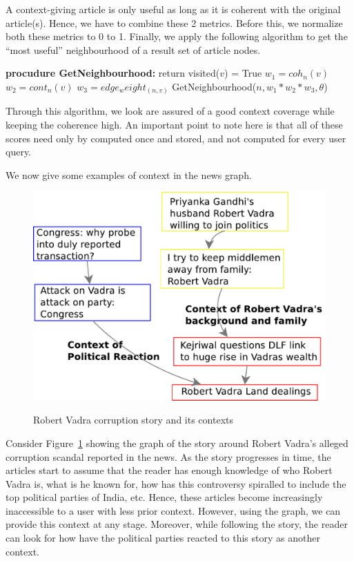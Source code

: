 A context-giving article is only useful as long as it is coherent with the original article(s).
Hence, we have to combine these 2 metrics. Before this, we normalize both these metrics to 0 to 1.
Finally, we apply the following algorithm to get the ``most useful'' neighbourhood of a result set of article nodes.

\begin{algorithmic}
  \State \textbf{procudure GetNeighbourhood:}
  \State {}
  \State {}
      \State return
    \EndIf
        \State visited($v$) = True
        \State $w_1 = coh_{n}(v)$
        \State $w_2 = cont_{n}(v)$
        \State $w_3 = edge_weight_{(n,v)}$
        \State GetNeighbourhood($n, w_1 * w_2 * w_3, \theta$)
      \EndIf
    \EndFor
\end{algorithmic}

Through this algorithm, we look are assured of a good context coverage while keeping the coherence high.
An important point to note here is that all of these scores need only by computed once and stored, and not computed for every user query. 

We now give some examples of context in the news graph.
\begin{figure}
\caption{Robert Vadra corruption story and its contexts}
\includegraphics[scale=0.36]{figures/graph-vadra.pdf}
\label{fig:vadra-corruption}
\end{figure}

Consider Figure~\ref{fig:vadra-corruption} showing the graph of the story around Robert Vadra's alleged
corruption scandal reported in the news. As the story progresses in time, the articles
start to assume that the reader has enough knowledge of who Robert Vadra is, what is he known for,
how has this controversy spiralled to include the top political parties of India, etc. Hence, these articles
become increasingly inaccessible to a user with less prior context. However, 
using the graph, we can provide this context at any stage. Moreover, while following the story, 
the reader can look for how have the political parties reacted to this story as another context.

